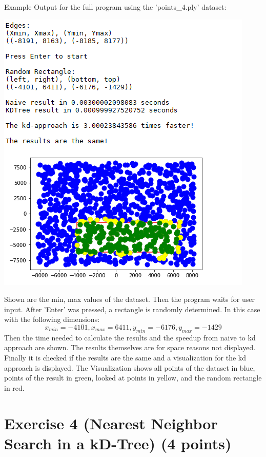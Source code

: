 \documentclass[english, fontsize=12pt, paper=a4, twoside=false, draft=true, pagesize=auto, version=last, DIV=16]{scrartcl}
\theoremstyle{break}
\begin{document}
\newpage

Example Output for the full program using the 'points\_4.ply' dataset:
\begin{center}
  \includegraphics{./images/task3.png}
\end{center}

Shown are the min, max values of the dataset. Then the program waits for user input.
After 'Enter' was pressed, a rectangle is randomly determined. In this case with the following dimensions:
\[x_{min}=-4101, x_{max}=6411, y_{min}=-6176, y_{max}=-1429\]
Then the time needed to calculate the results and the speedup from naive to kd approach are shown. The results themselves are for space reasons not displayed.
Finally it is checked if the results are the same and a visualization for the kd approach is displayed.
The Visualization shows all points of the dataset in blue, points of the result in green, looked at points in yellow, and the random rectangle in red.


\newpage

\section*{\large Exercise 4 (Nearest Neighbor Search in a kD-Tree) {\normalsize \hfill (4 points)}}
\end{document}

